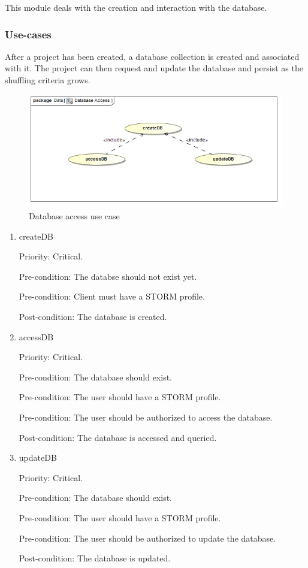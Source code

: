 This module deals with the creation and interaction with the database.

\subsubsection{Use-cases}
After a project has been created, a database collection is created and associated with it. The project can then request and update the database and persist as the shuffling criteria grows.\par
\begin{figure}[h]
	\centering
	\includegraphics[width=15cm]{./graphics/databaseAccessUseCase.jpg}
	\caption{Database access use case}
\end{figure}
\begin{enumerate}
\item createDB\par
Priority: Critical.\par
Pre-condition: The databse should not exist yet.\par
Pre-condition: Client must have a STORM profile.\par
Post-condition: The database is created.\par

\item accessDB\par
Priority: Critical.\par
Pre-condition: The database should exist.\par
Pre-condition: The user should have a STORM profile.\par
Pre-condition: The user should be authorized to access the database.\par
Post-condition: The database is accessed and queried.\par

\item updateDB\par
Priority: Critical.\par
Pre-condition: The database should exist.\par
Pre-condition: The user should have a STORM profile.\par
Pre-condition: The user should be authorized to update the database.\par
Post-condition: The database is updated.\par

\end{enumerate}